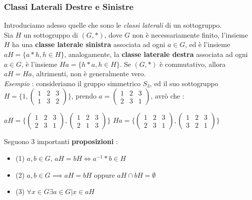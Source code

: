 \documentclass[12pt, letterpaper]{article}
\begin{document}
\subsubsection{Classi Laterali Destre e Sinistre} \label{classiLaterali}
 Introduciamo adesso quelle che sono le \textit{classi laterali} di un sottogruppo.\\
 Sia \(H\) un sottogruppo di \((G,*)\), dove \(G\) non è necessariamente finito, l'insieme 
 \(H\) ha una \textbf{classe laterale sinistra} associata ad ogni \(a\in G\), ed è l'insieme \(aH=\{a*h, h\in H\}\), 
 analogamente, la \textbf{classe laterale destra} associata ad ogni \(a\in G\),  è l'insieme \(Ha=\{h*a, h\in H\}\). 
 Se \((G,*)\) è commutativo, allora \(aH= Ha\), altrimenti, non è generalmente vero. \\
 \textit{Esempio }: consideriamo il gruppo simmetrico \(S_3\), ed il suo sottogruppo \(H=\Bigg\{1,
 \begin{pmatrix}
    1 & 2 & 3\\
    1 & 3 & 2
    \end{pmatrix}
    \Bigg\}\), prendo \(a= \begin{pmatrix}
        1 & 2 & 3\\
        2 & 3 & 1
        \end{pmatrix}\), avrò che : \begin{center}
            \(
            aH=  \Bigg\{\begin{pmatrix}
                1 & 2 & 3\\
                2 & 3 & 1
                \end{pmatrix},
            \begin{pmatrix}
               1 & 2 & 3\\
               2 & 1 & 3
               \end{pmatrix}
               \Bigg\}  
            \) \hphantom{aaaaa} \(
            Ha=   \Bigg\{\begin{pmatrix}
                1 & 2 & 3\\
                2 & 3 & 1
                \end{pmatrix},
            \begin{pmatrix}
               1 & 2 & 3\\
               3 & 2 & 1
               \end{pmatrix}
               \Bigg\} 
            \)
        \end{center}
Seguono 3 importanti \textbf{proposizioni} : \begin{itemize}
    \item (1) \(a,b\in G\), \(aH=bH\iff a^{-1}*b\in H\)
    \item (2) \(a,b\in G\implies aH=bH \) oppure \(aH\cap bH =\emptyset\) 
    \item (3) \(\forall x \in G \exists a\in G | x\in aH\)
\end{itemize}
\end{document}
